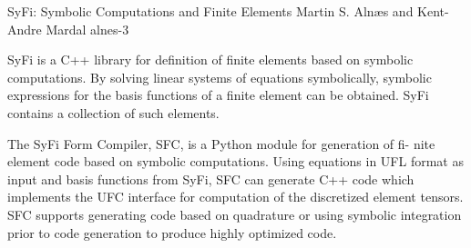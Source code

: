               {SyFi: Symbolic Computations and Finite Elements}
              {Martin S. Aln\ae{}s and Kent-Andre Mardal}
              {alnes-3}

SyFi is a C++ library for definition of finite elements based on
symbolic computations. By solving linear systems of equations
symbolically, symbolic expressions for the basis functions of a finite
element can be obtained. SyFi contains a collection of such elements.

The SyFi Form Compiler, SFC, is a Python module for generation of fi-
nite element code based on symbolic computations. Using equations in
UFL format as input and basis functions from SyFi, SFC can generate
C++ code which implements the UFC interface for computation of the
discretized element tensors. SFC supports generating code based on
quadrature or using symbolic integration prior to code generation to
produce highly optimized code.
